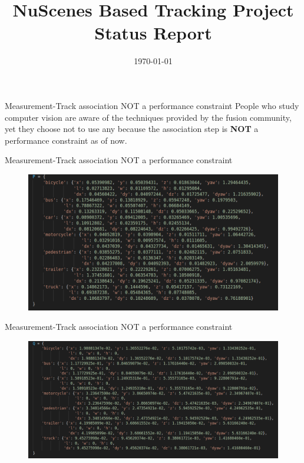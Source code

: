 \documentclass[aspectratio=169,xcolor=dvipsnames]{beamer}
\title{NuScenes Based Tracking Project Status Report} %
\date{\today} %
\begin{document}
\begin{frame}
    \titlepage
\end{frame}


\begin{frame}{Measurement-Track association NOT a performance constraint}
    People who study computer vision are aware of the techniques provided by the fusion community, yet they choose not to use any because the association step is \textbf{NOT} 
    a performance constraint as of now.
\end{frame}

\begin{frame}{Measurement-Track association NOT a performance constraint}
    \begin{figure}
    \includegraphics[width=0.9\linewidth]{DA/2.png}
    \end{figure}
\end{frame}

\begin{frame}{Measurement-Track association NOT a performance constraint}
    \begin{figure}
    \includegraphics[width=0.9\linewidth]{DA/3.png}
    \end{figure}
\end{frame}
\end{document}
